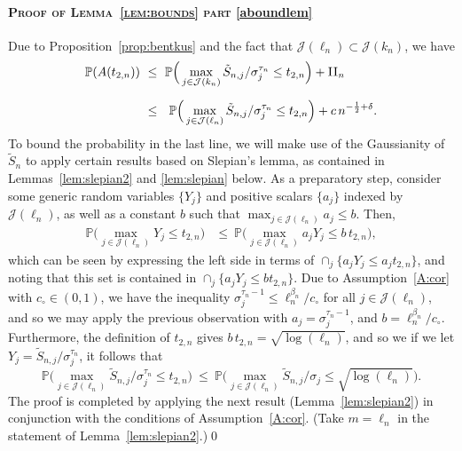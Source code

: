 \documentclass[aos,preprint]{imsart}
\numberwithin{equation}{section}
\theoremstyle{plain}
\newcommand{\II}{\textsc{II}}
\newcommand{\J}{\mathcal{J}}
\renewcommand{\P}{\mathbb{P}}
\newcommand{\1}{{\bf{1}}}
\newcommand{\0}{\mathbf{0}}
\begin{document}
\paragraph{\textsc{Proof of Lemma~\ref{lem:bounds} part} \eqref{aboundlem}} Due to Proposition~\ref{prop:bentkus} and the fact that $\J(\ell_n)\subset \J(k_n)$, we have
%
\begin{equation}
\begin{split}
\P(A(t_{2,n})) &\ \leq \ \P\Big(\max_{j\in\J(k_n)} \tilde S_{n,j}/\sigma_j^{\tau_n}\leq t_{2,n}\Big)+\II_n\\[0.2cm]
%
& \ \leq \  \ \P\Big(\max_{j\in\J(\ell_n)} \tilde S_{n,j}/\sigma_j^{\tau_n}\leq t_{2,n}\Big)+  c\, n^{-\frac 12+\delta}.
\end{split}
\end{equation}
%
%
%
To bound the probability in the last line, we will make use of the Gaussianity of $\tilde S_n$ to apply certain results based on Slepian's lemma, as contained in Lemmas~\ref{lem:slepian2} and \ref{lem:slepian} below.  As a preparatory step, consider some generic random variables $\{Y_j\}$ and positive scalars $\{a_j\}$ indexed by $\J(\ell_n)$, as well as a constant $b$ such that $\max_{j\in\J(\ell_n)}a_j\leq b$. Then,
\begin{equation}
\begin{split}
\P\Big(\max_{j\in\J(\ell_n)} Y_j\leq t_{2,n}\Big) & \leq \ \P\Big(\max_{j\in\J(\ell_n)}a_jY_j \leq b\, t_{2,n}\Big),
%
\end{split}
\end{equation}
which can be seen by expressing the left side in terms of $\cap_j\{a_jY_j\leq a_j t_{2,n}\}$, and noting that this set is contained in $\cap_j\{a_jY_j\leq b t_{2,n}\}$. Due to Assumption~\ref{A:cor} with $c_{\circ}\in(0,1)$, we have the inequality $\sigma_j^{\tau_n-1}\leq \ell_n^{\beta_n}/c_{\circ}$ for all $j\in\J(\ell_n)$, and so we may apply the previous observation with  $a_j=\sigma_j^{\tau_n-1}$, and $b=\ell_n^{\beta_n}/c_{\circ}$. Furthermore, the definition of $t_{2,n}$ gives $b\, t_{2,n}=\sqrt{\log(\ell_n)}$, and so we if we let $Y_j=\tilde S_{n,j}/\sigma_j^{\tau_n}$, it follows that
$$\P\Big(\max_{j\in\J(\ell_n)} \tilde S_{n,j}/\sigma_j^{\tau_n}\leq t_{2,n}\Big) \ \leq \  \P\Big(\max_{j\in\J(\ell_n)} \tilde S_{n,j}/\sigma_j\leq \sqrt{\log(\ell_n)}\Big).$$
%
The proof is completed by applying the next result (Lemma~\ref{lem:slepian2}) in conjunction with the conditions of Assumption~\ref{A:cor}. (Take $m=\ell_n$ in the statement of Lemma~\ref{lem:slepian2}.)\qed
\end{document}
